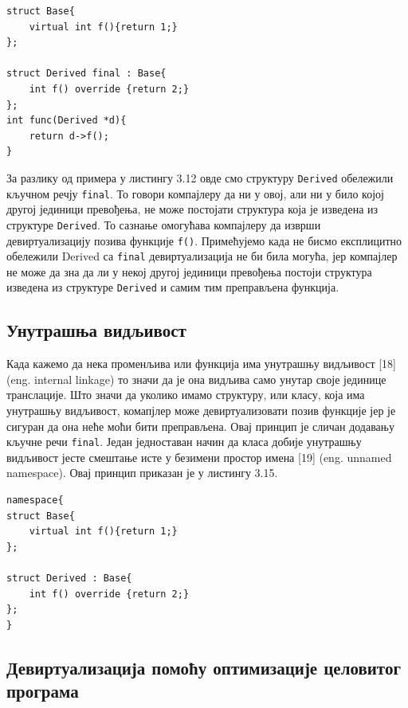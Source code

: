 \documentclass[12pt,oneside]{memoir}
\begin{document}
\begin{lstlisting}[frame=single,caption={Ključna reč final }, captionpos=b]
struct Base{
    virtual int f(){return 1;}
};

struct Derived final : Base{
    int f() override {return 2;}
};
int func(Derived *d){
    return d->f();
}

\end{lstlisting}
 
 За разлику од примера у листингу 3.12 овде смо структуру \texttt{Derived} обележили кључном 
 речју \texttt{final}.
 То говори компајлеру да ни у овој, али ни у било којој другој јединици превођења, 
 не може постојати структура која је изведена из структуре \texttt{Derived}.
 То сазнање омогућава компајлеру да изврши девиртуализацију позива функције \texttt{f()}.
 Примећујемо када не бисмо експлицитно обележили  Derived са \texttt{final} девиртуализација
 не би била могућа, јер компајлер не може да зна да ли у некој другој јединици превођења
 постоји структура изведена из структуре \texttt{Derived} и самим тим преправљена функција.
 
 \subsection{Унутрашња видљивост}
 Када кажемо да нека променљива или функција има унутрашњу видљивост [18]
 (eng. internal linkage) то значи да је она видљива само унутар своје јединице
 транслације.
 Што значи да уколико имамо структуру, или класу, која има унутрашњу видљивост,
 комапјлер може девиртуализовати позив функције јер је сигуран да она неће моћи бити
 преправљена.
 Овај принцип је сличан додавању кључне речи  \texttt{final}.
 Један једноставан начин да класа добије унутрашњу видљивост јесте смештање исте
 у безимени простор имена [19] (eng. unnamed namespace).
 Овај принцип приказан је у листингу 3.15.
 
 \begin{lstlisting}[frame=single,caption={Unutrašnja vidljivost}, captionpos=b]
namespace{
struct Base{
    virtual int f(){return 1;}
};

struct Derived : Base{
    int f() override {return 2;}
};
}
\end{lstlisting}
 
\subsection{Девиртуализација помоћу оптимизације целовитог програма}
 
\end{document}
